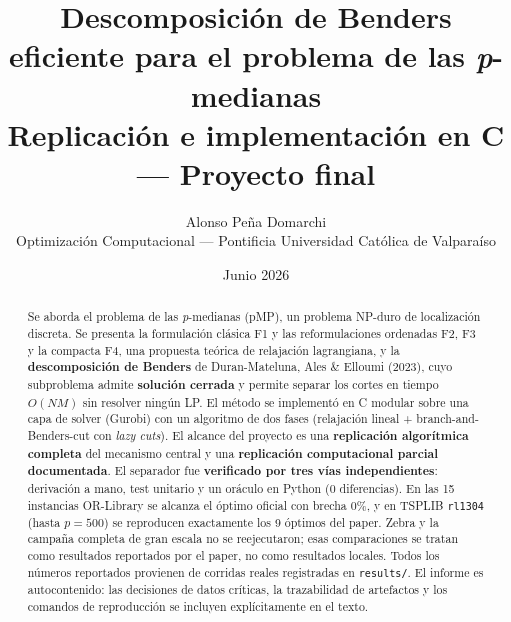 \documentclass[11pt,a4paper]{article}
\title{\textbf{Descomposición de Benders eficiente para el problema de las \textit{p}-medianas}\\[4pt]
\large Replicación e implementación en C — Proyecto final}
\author{Alonso Peña Domarchi\\\small Optimización Computacional — Pontificia Universidad Católica de Valparaíso}
\date{Junio 2026}
\theoremstyle{remark}
\begin{document}
\maketitle

\begin{abstract}
\noindent
Se aborda el problema de las \textit{p}-medianas (pMP), un problema NP-duro de localización
discreta. Se presenta la formulación clásica F1 y las reformulaciones ordenadas F2, F3 y la
compacta F4, una propuesta teórica de relajación lagrangiana, y la \textbf{descomposición de
Benders} de Duran-Mateluna, Ales \& Elloumi (2023), cuyo subproblema admite \textbf{solución
cerrada} y permite separar los cortes en tiempo $O(NM)$ sin resolver ningún LP. El método se
implementó en C modular sobre una capa de solver (Gurobi) con un algoritmo de dos fases
(relajación lineal + branch-and-Benders-cut con \textit{lazy cuts}). El alcance del
proyecto es una \textbf{replicación algorítmica completa} del mecanismo central y una
\textbf{replicación computacional parcial documentada}. El separador fue \textbf{verificado por
tres vías independientes}: derivación a mano, test unitario y un oráculo en Python (0
diferencias). En las 15 instancias OR-Library se alcanza el óptimo oficial con brecha $0\%$, y
en TSPLIB \texttt{rl1304} (hasta $p=500$) se reproducen exactamente los 9 óptimos del paper.
Zebra y la campaña completa de gran escala no se reejecutaron; esas comparaciones se tratan como
resultados reportados por el paper, no como resultados locales. Todos los números reportados
provienen de corridas reales registradas en \texttt{results/}. El informe es autocontenido: las
decisiones de datos críticas, la trazabilidad de artefactos y los comandos de reproducción se
incluyen explícitamente en el texto.
\end{abstract}

\tableofcontents
\bigskip













\end{document}
